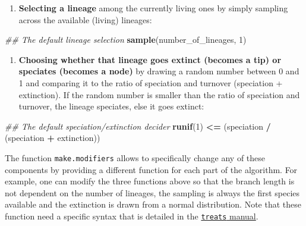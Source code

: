 \documentclass[
]{article}
\newenvironment{Shaded}{\begin{snugshade}}{\end{snugshade}}
\newcommand{\CommentTok}[1]{\textcolor[rgb]{0.56,0.35,0.01}{\textit{#1}}}
\newcommand{\DecValTok}[1]{\textcolor[rgb]{0.00,0.00,0.81}{#1}}
\newcommand{\KeywordTok}[1]{\textcolor[rgb]{0.13,0.29,0.53}{\textbf{#1}}}
\newcommand{\NormalTok}[1]{#1}
\newcommand{\OperatorTok}[1]{\textcolor[rgb]{0.81,0.36,0.00}{\textbf{#1}}}
\newcommand{\StringTok}[1]{\textcolor[rgb]{0.31,0.60,0.02}{#1}}
\providecommand{\tightlist}{%
  \setlength{\itemsep}{0pt}\setlength{\parskip}{0pt}}
\begin{document}
\begin{enumerate}
\def\labelenumi{\arabic{enumi}.}
\setcounter{enumi}{1}
\tightlist
\item
  \textbf{Selecting a lineage} among the currently living ones by simply
  sampling across the available (living) lineages:
\end{enumerate}

\begin{Shaded}
\begin{Highlighting}[]
\CommentTok{\#\# The default lineage selection}
\KeywordTok{sample}\NormalTok{(number\_of\_lineages, }\DecValTok{1}\NormalTok{)}
\end{Highlighting}
\end{Shaded}

\begin{enumerate}
\def\labelenumi{\arabic{enumi}.}
\setcounter{enumi}{2}
\tightlist
\item
  \textbf{Choosing whether that lineage goes extinct (becomes a tip) or
  speciates (becomes a node)} by drawing a random number between 0 and 1
  and comparing it to the ratio of speciation and turnover (speciation +
  extinction). If the random number is smaller than the ratio of
  speciation and turnover, the lineage speciates, else it goes extinct:
\end{enumerate}

\begin{Shaded}
\begin{Highlighting}[]
\CommentTok{\#\# The default speciation/extinction decider}
\KeywordTok{runif}\NormalTok{(}\DecValTok{1}\NormalTok{) }\OperatorTok{\textless{}=}\StringTok{ }\NormalTok{(speciation }\OperatorTok{/}\StringTok{ }\NormalTok{(speciation }\OperatorTok{+}\StringTok{ }\NormalTok{extinction))}
\end{Highlighting}
\end{Shaded}

The function \texttt{make.modifiers} allows to specifically change any
of these components by providing a different function for each part of
the algorithm. For example, one can modify the three functions above so
that the branch length is not dependent on the number of lineages, the
sampling is always the first species available and the extinction is
drawn from a normal distribution. Note that these function need a
specific syntax that is detailed in the
\href{http://tguillerme.github.io/treats.html}{\texttt{treats} manual}.
\end{document}
